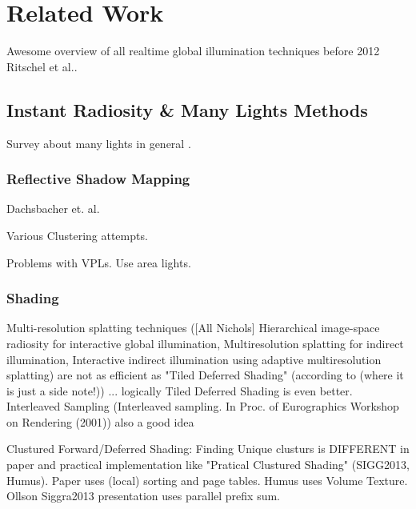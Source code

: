 \documentclass[thesis.tex]{subfiles}
\begin{document}
\chapter{Related Work}
\label{chap:prevwork}


Awesome overview of all realtime global illumination techniques before 2012 \cite{bib:RealtimeGIOverview} Ritschel et al..

\section {Instant Radiosity \& Many Lights Methods}
Survey about many lights in general \cite{bib:manylightssurvey2014}.


\subsection{Reflective Shadow Mapping}
Dachsbacher et. al. \cite{bib:reflectiveshadowmaps}

Various Clustering attempts.

Problems with VPLs. Use area lights.

\subsection{Shading}
Multi-resolution splatting techniques ([All Nichols] Hierarchical
image-space radiosity for interactive global illumination, Multiresolution splatting for indirect illumination, Interactive indirect illumination using adaptive multiresolution splatting) are not as efficient as "Tiled Deferred Shading" (according to \cite{bib:clusturedpreconvoledradiancecaching} (where it is just a side note!)) ... logically Tiled Deferred Shading is even better.
Interleaved Sampling (Interleaved sampling. In
Proc. of Eurographics Workshop on Rendering (2001)) also a good idea 

Clustured Forward/Deferred Shading: Finding Unique clusturs is DIFFERENT in paper \cite{bib:clusturedshading} and practical implementation like "Pratical Clustured Shading" (SIGG2013, Humus). Paper uses (local) sorting and page tables. Humus uses Volume Texture. Ollson Siggra2013 presentation uses parallel prefix sum.
\end{document}
